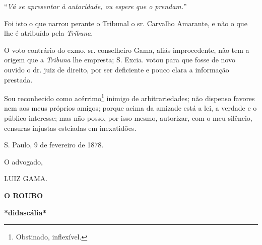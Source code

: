 ``\emph{Vá se apresentar à autoridade, ou espere que o prendam.}''

Foi isto o que narrou perante o Tribunal o sr. Carvalho Amarante, e não
o que lhe é atribuído pela \emph{Tribuna}.

O voto contrário do exmo. sr. conselheiro Gama, aliás improcedente, não
tem a origem que a \emph{Tribuna} lhe empresta; S. Excia. votou para que
fosse de novo ouvido o dr. juiz de direito, por ser deficiente e pouco
clara a informação prestada.

Sou reconhecido como acérrimo\footnote{Obstinado, inflexível.} inimigo
de arbitrariedades; não dispenso favores nem aos meus próprios amigos;
porque acima da amizade está a lei, a verdade e o público interesse; mas
não posso, por isso mesmo, autorizar, com o meu silêncio, censuras
injustas esteiadas em inexatidões.

S. Paulo, 9 de fevereiro de 1878.

O advogado,

LUIZ GAMA.

\textbf{O ROUBO}

\textbf{*didascália*}

